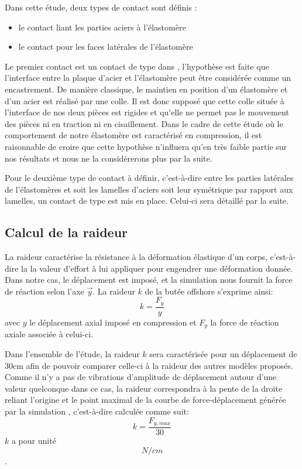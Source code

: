 ﻿\documentclass{article}
\newcommand{\abaqus}{\bsc{Abaqus}\xspace}
\begin{document}
Dans cette étude, deux types de contact sont définis :
\begin{itemize}
\item le contact liant les parties aciers à l'élastomère
\item le contact pour les faces latérales de l'élastomère
\end{itemize}

Le premier contact est un contact de type  dans \abaqus, l'hypothèse est faite que l'interface entre la plaque d'acier et l'élastomère peut être considérée comme un encastrement. De manière classique, le maintien en position d'un élastomère et d'un acier est réalisé par une colle. Il est donc supposé que cette colle située à l'interface de nos deux pièces est rigides et qu'elle ne permet pas le mouvement des pièces ni en traction ni en cisaillement. Dans le cadre de cette étude où le comportement de notre élastomère est caractérisé en compression, il est raisonnable de croire que cette hypothèse n'influera qu'en très faible partie sur nos résultats et nous ne la considérerons plus par la suite.

Pour le deuxième type de contact à définir, c'est-à-dire entre les parties latérales de l'élastomères et soit les lamelles d'aciers soit leur symétrique par rapport aux lamelles, un contact de type  est mis en place. Celui-ci sera détaillé par la suite.

\subsection{Calcul de la raideur}

La raideur caractérise la résistance à la déformation élastique d'un corps, c'est-à-dire la la valeur d'effort à lui appliquer pour engendrer une déformation donnée. Dans notre cas, le déplacement est imposé, et la simulation \abaqus nous fournit la force de réaction selon l'axe $\vec{y}$. La raideur $k$ de la butée offshore s'exprime ainsi:
\begin{displaymath}
		k=\frac{F_{y}}{y}
	\end{displaymath}
avec $y$ le déplacement axial imposé en compression et $F_{y}$ la force de réaction axiale associée à celui-ci. 

Dans l'ensemble de l'étude, la raideur $k$ sera caractérisée pour un déplacement de 30cm afin de pouvoir comparer celle-ci à la raideur des autres modèles proposés. Comme il n'y a pas de vibrations d'amplitude de déplacement autour d'une valeur quelconque dans ce cas, la raideur correspondra à la pente de la droite reliant l'origine et le point maximal de la courbe de force-déplacement générée par la simulation \abaqus, c'est-à-dire calculée comme suit:
\begin{displaymath}
		k=\frac{F_{y,max}}{30}
	\end{displaymath}
$k$ a pour unité \[N/cm\].
\end{document}

